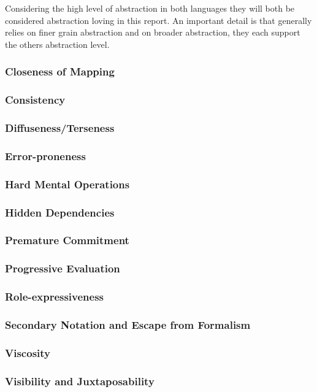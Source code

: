 Considering the high level of abstraction in both languages they will both be considered abstraction loving in this report. An important detail is that \fs generally relies on finer grain abstraction and \cs on broader abstraction, they each support the others abstraction level.

\subsubsection{Closeness of Mapping}


\subsubsection{Consistency}


\subsubsection{Diffuseness/Terseness}


\subsubsection{Error-proneness}


\subsubsection{Hard Mental Operations}


\subsubsection{Hidden Dependencies}


\subsubsection{Premature Commitment}


\subsubsection{Progressive Evaluation}


\subsubsection{Role-expressiveness}


\subsubsection{Secondary Notation and Escape from Formalism}


\subsubsection{Viscosity}


\subsubsection{Visibility and Juxtaposability}
